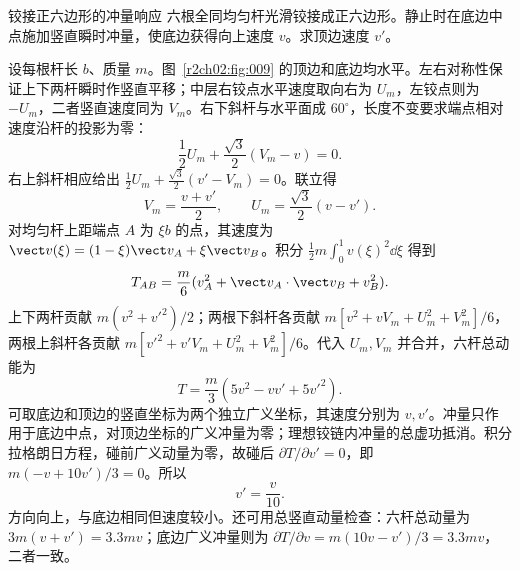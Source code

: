 \begin{practicebox}{铰接正六边形的冲量响应}
六根全同均匀杆光滑铰接成正六边形。静止时在底边中点施加竖直瞬时冲量，使底边获得向上速度 $v$。求顶边速度 $v'$。
\label{r2ch02:pr:017}
\begin{solution}
设每根杆长 $b$、质量 $m$。图~\ref{r2ch02:fig:009} 的顶边和底边均水平。左右对称性保证上下两杆瞬时作竖直平移；中层右铰点水平速度取向右为 $U_m$，左铰点则为 $-U_m$，二者竖直速度同为 $V_m$。右下斜杆与水平面成 $60^\circ$，长度不变要求端点相对速度沿杆的投影为零：
\[
 \frac12U_m+\frac{\sqrt3}{2}(V_m-v)=0.
\]
右上斜杆相应给出
$\tfrac12U_m+\tfrac{\sqrt3}{2}(v'-V_m)=0$。联立得
\[
 V_m=\frac{v+v'}2,\qquad U_m=\frac{\sqrt3}{2}(v-v').
\]
\figHexagonImpulse
对均匀杆上距端点 $A$ 为 $\xi b$ 的点，其速度为
$\vect v(\xi)=(1-\xi)\vect v_A+\xi\vect v_B$。积分 $\tfrac12m\int_0^1v(\xi)^2\dd\xi$ 得到
\[
 T_{AB}=\frac m6(v_A^2+\vect v_A\cdot\vect v_B+v_B^2).
\]
上下两杆贡献 $m(v^2+v'^2)/2$；两根下斜杆各贡献
$m[v^2+vV_m+U_m^2+V_m^2]/6$，两根上斜杆各贡献
$m[v'^2+v'V_m+U_m^2+V_m^2]/6$。代入 $U_m,V_m$ 并合并，六杆总动能为
\[
 T=\frac m3(5v^2-vv'+5v'^2).
\]
可取底边和顶边的竖直坐标为两个独立广义坐标，其速度分别为 $v,v'$。冲量只作用于底边中点，对顶边坐标的广义冲量为零；理想铰链内冲量的总虚功抵消。积分拉格朗日方程，碰前广义动量为零，故碰后
$\partial T/\partial v'=0$，即 $m(-v+10v')/3=0$。所以
\[
 \boxed{v'=\frac v{10}}.
\]
方向向上，与底边相同但速度较小。还可用总竖直动量检查：六杆总动量为 $3m(v+v')=3.3mv$；底边广义冲量则为 $\partial T/\partial v=m(10v-v')/3=3.3mv$，二者一致。
\end{solution}
\end{practicebox}

